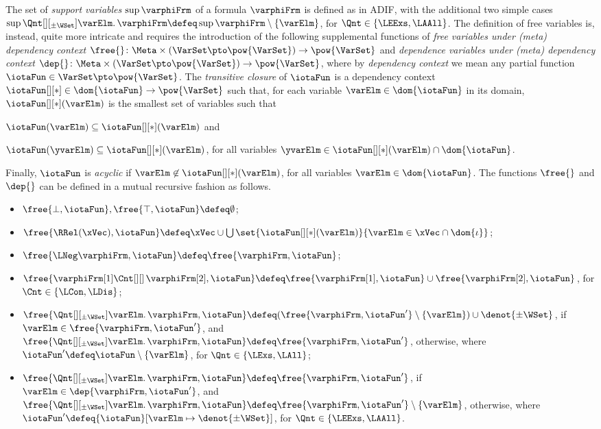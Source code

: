 \documentclass[authoryear]{elsarticle}
\begin{document}
The set of \emph{support variables} $\sup{\varphiFrm}$ of a \Meta formula
$\varphiFrm$ is defined as in ADIF, with the additional two simple cases
$\sup{\Qnt[][_{\pm\WSet}] \varElm \ldotp \varphiFrm} \defeq \sup{\varphiFrm}
\setminus \{ \varElm \}$, for $\Qnt \in \{ \LEExs, \LAAll \}$.
%
The definition of free variables is, instead, quite more intricate and requires
the introduction of the following supplemental functions of \emph{free variables
under (meta) dependency context} $\free{} \colon \Meta \times (\VarSet \pto
\pow{\VarSet}) \to \pow{\VarSet}$ and \emph{dependence variables under (meta)
dependency context} $\dep{} \colon \Meta \times (\VarSet \pto \pow{\VarSet}) \to
\pow{\VarSet}$, where by \emph{dependency context} we mean any partial function
$\iotaFun \in \VarSet \pto \pow{\VarSet}$.
The \emph{transitive closure} of $\iotaFun$ is a dependency context
$\iotaFun[][*] \in \dom{\iotaFun} \to \pow{\VarSet}$ such that, for each
variable $\varElm \in \dom{\iotaFun}$ in its domain, $\iotaFun[][*](\varElm)$ is
the smallest set of variables such that
\begin{inparaenum}[(a)]
\item
  $\iotaFun(\varElm) \subseteq \iotaFun[][*](\varElm)$ and
\item
  $\iotaFun(\yvarElm) \subseteq \iotaFun[][*](\varElm)$, for all variables
  $\yvarElm \in \iotaFun[][*](\varElm) \cap \dom{\iotaFun}$.
\end{inparaenum}
Finally, $\iotaFun$ is \emph{acyclic} if $\varElm \not\in
\iotaFun[][*](\varElm)$, for all variables $\varElm \in \dom{\iotaFun}$.
%
The functions $\free{}$ and $\dep{}$ can be defined in a mutual recursive
fashion as follows.
%
\begin{itemize}[$\bullet$]
\item
  $\free{\bot, \iotaFun}, \free{\top, \iotaFun} \defeq \emptyset$;
\item
  $\free{\RRel(\xVec), \iotaFun} \defeq \xVec \cup \bigcup \set{
  \iotaFun[][*](\varElm) }{ \varElm \in \xVec \cap \dom{\iota} }$;
\item
  $\free{\LNeg \varphiFrm, \iotaFun} \defeq \free{\varphiFrm, \iotaFun}$;
\item
  $\free{\varphiFrm[1] \Cnt[][]\, \varphiFrm[2], \iotaFun} \defeq
  \free{\varphiFrm[1], \iotaFun} \cup \free{\varphiFrm[2], \iotaFun}$, for $\Cnt
  \in \{ \LCon, \LDis \}$;
\item
  $\free{\Qnt[][_{\pm\WSet}] \varElm \ldotp \varphiFrm, \iotaFun} \defeq
  (\free{\varphiFrm, \iotaFun'} \setminus \{ \varElm \}) \cup \denot{\pm\WSet}$,
  if $\varElm \in \free{\varphiFrm, \iotaFun'}$, and  $\free{\Qnt[][_{\pm\WSet}]
  \varElm \ldotp \varphiFrm, \iotaFun} \allowbreak  \defeq \free{\varphiFrm,
  \iotaFun'}$, otherwise, where $\iotaFun' \defeq  \iotaFun \setminus \{
  \varElm \}$, for $\Qnt \in \{ \LExs, \LAll \}$;
\item
  $\free{\Qnt[][_{\pm\WSet}] \varElm \ldotp \varphiFrm, \iotaFun} \defeq
  \free{\varphiFrm, \iotaFun'}$, if $\varElm \in \dep{\varphiFrm, \iotaFun'}$,
  and $\free{\Qnt[][_{\pm\WSet}] \varElm \ldotp \varphiFrm, \iotaFun} \defeq
  \free{\varphiFrm, \iotaFun'} \setminus \{ \varElm \}$, otherwise, where
  $\iotaFun' \defeq {\iotaFun}[\varElm \mapsto \denot{\pm\WSet}]$, for $\Qnt \in
  \{ \LEExs, \LAAll \}$.
\end{itemize}
\end{document}
